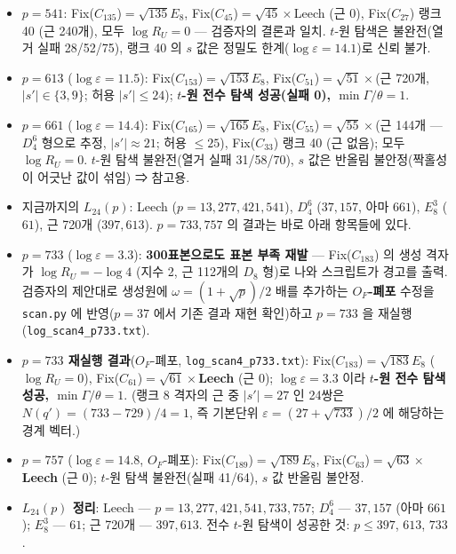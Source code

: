 \begin{itemize}
\tightlist
\item
  \(p=541\): Fix(\(C_{135}\))\(=\sqrt{135}E_8\), Fix(\(C_{45}\))\(=\sqrt{45}\times\)Leech (근 0), Fix(\(C_{27}\)) 랭크 40 (근 240개), 모두 \(\log R_U=0\) --- 검증자의 결론과 일치. \(t\)-원 탐색은 불완전(열거 실패 28/52/75), 랭크 40 의 \(s\) 값은 정밀도 한계(\(\log\varepsilon=14.1\))로 신뢰 불가.
\item
  \(p=613\) (\(\log\varepsilon=11.5\)): Fix(\(C_{153}\))\(=\sqrt{153}E_8\), Fix(\(C_{51}\))\(=\sqrt{51}\times\)(근 720개, \(|s'|\in\{3,9\}\); 허용 \(|s'|\le24\)); \textbf{\(t\)-원 전수 탐색 성공(실패 0), \(\min\Gamma/\theta=1\)}.
\item
  \(p=661\) (\(\log\varepsilon=14.4\)): Fix(\(C_{165}\))\(=\sqrt{165}E_8\), Fix(\(C_{55}\))\(=\sqrt{55}\times\)(근 144개 --- \(D_4^6\) 형으로 추정, \(|s'|\approx21\); 허용 \(\le25\)), Fix(\(C_{33}\)) 랭크 40 (근 없음); 모두 \(\log R_U=0\). \(t\)-원 탐색 불완전(열거 실패 31/58/70), \(s\) 값은 반올림 불안정(짝홀성이 어긋난 값이 섞임) ⇒ 참고용.
\item
  지금까지의 \(L_{24}(p)\): Leech (\(p=13,277,421,541\)), \(D_4^6\) (\(37,157\), 아마 \(661\)), \(E_8^3\) (\(61\)), 근 720개 (\(397,613\)). \(p=733,757\) 의 결과는 바로 아래 항목들에 있다.
\item
  \(p=733\) (\(\log\varepsilon=3.3\)): \textbf{300표본으로도 표본 부족 재발} --- Fix(\(C_{183}\)) 의 생성 격자가 \(\log R_U=-\log4\) (지수 2, 근 112개의 \(D_8\) 형)로 나와 스크립트가 경고를 출력. 검증자의 제안대로 생성원에 \(\omega=(1+\sqrt p)/2\) 배를 추가하는 \textbf{\(O_F\)-폐포} 수정을 \texttt{scan.py} 에 반영(\(p=37\) 에서 기존 결과 재현 확인)하고 \(p=733\) 을 재실행(\texttt{log\_scan4\_p733.txt}).
\item
  \textbf{\(p=733\) 재실행 결과}(\(O_F\)-폐포, \texttt{log\_scan4\_p733.txt}): Fix(\(C_{183}\))\(=\sqrt{183}E_8\) (\(\log R_U=0\)), Fix(\(C_{61}\))\(=\sqrt{61}\times\)\textbf{Leech} (근 0); \(\log\varepsilon=3.3\) 이라 \textbf{\(t\)-원 전수 탐색 성공, \(\min\Gamma/\theta=1\)}. (랭크 8 격자의 근 중 \(|s'|=27\) 인 24쌍은 \(N(q')=(733-729)/4=1\), 즉 기본단위 \(\varepsilon=(27+\sqrt{733})/2\) 에 해당하는 경계 벡터.)
\item
  \(p=757\) (\(\log\varepsilon=14.8\), \(O_F\)-폐포): Fix(\(C_{189}\))\(=\sqrt{189}E_8\), Fix(\(C_{63}\))\(=\sqrt{63}\times\)\textbf{Leech} (근 0); \(t\)-원 탐색 불완전(실패 41/64), \(s\) 값 반올림 불안정.
\item
  \textbf{\(L_{24}(p)\) 정리}: Leech --- \(p=13,277,421,541,733,757\); \(D_4^6\) --- \(37,157\) (아마 \(661\)); \(E_8^3\) --- \(61\); 근 720개 --- \(397,613\). 전수 \(t\)-원 탐색이 성공한 것: \(p\le397\), \(613\), \(733\).
\end{itemize}

